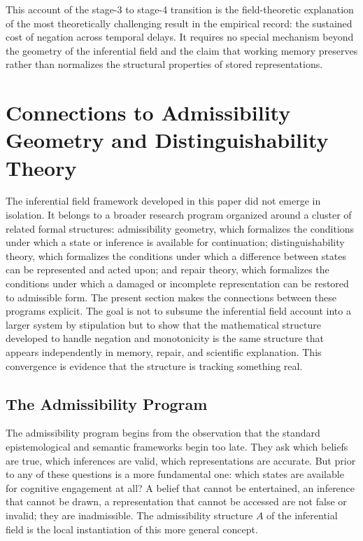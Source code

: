 \documentclass[12pt]{article}
\theoremstyle{remark}
\begin{document}
This account of the stage-3 to stage-4 transition is the field-theoretic
explanation of the most theoretically challenging result in the empirical
record: the sustained cost of negation across temporal delays. It
requires no special mechanism beyond the geometry of the inferential
field and the claim that working memory preserves rather than normalizes
the structural properties of stored representations.

\section{Connections to Admissibility Geometry and Distinguishability
Theory}

The inferential field framework developed in this paper did not emerge in
isolation. It belongs to a broader research program organized around a
cluster of related formal structures: admissibility geometry, which
formalizes the conditions under which a state or inference is available
for continuation; distinguishability theory, which formalizes the
conditions under which a difference between states can be represented and
acted upon; and repair theory, which formalizes the conditions under
which a damaged or incomplete representation can be restored to
admissible form. The present section makes the connections between these
programs explicit. The goal is not to subsume the inferential field
account into a larger system by stipulation but to show that the
mathematical structure developed to handle negation and monotonicity is
the same structure that appears independently in memory, repair, and
scientific explanation. This convergence is evidence that the structure
is tracking something real.

\subsection{The Admissibility Program}

The admissibility program begins from the observation that the standard
epistemological and semantic frameworks begin too late. They ask which
beliefs are true, which inferences are valid, which representations are
accurate. But prior to any of these questions is a more fundamental one:
which states are available for cognitive engagement at all? A belief that
cannot be entertained, an inference that cannot be drawn, a
representation that cannot be accessed are not false or invalid; they
are inadmissible. The admissibility structure $A$ of the inferential
field is the local instantiation of this more general concept.
\end{document}
